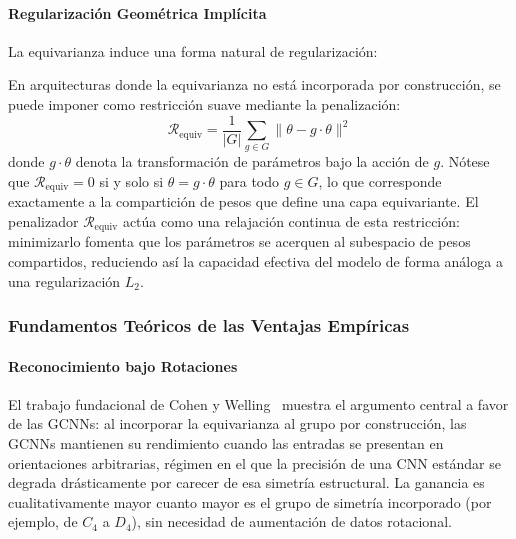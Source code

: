 \paragraph{Regularización Geométrica Implícita}

La equivarianza induce una forma natural de regularización:

\begin{remark}\label{prop:regularizacion_equivarianza}
En arquitecturas donde la equivarianza no está incorporada por construcción, se puede imponer como restricción suave mediante la penalización:
\begin{equation}
\mathcal{R}_{\text{equiv}} = \frac{1}{|G|} \sum_{g \in G} \|\theta - g \cdot \theta\|^2
\end{equation}
donde $g \cdot \theta$ denota la transformación de parámetros bajo la acción de $g$. Nótese que $\mathcal{R}_{\text{equiv}} = 0$ si y solo si $\theta = g \cdot \theta$ para todo $g \in G$, lo que corresponde exactamente a la compartición de pesos que define una capa equivariante. El penalizador $\mathcal{R}_{\text{equiv}}$ actúa como una relajación continua de esta restricción: minimizarlo fomenta que los parámetros se acerquen al subespacio de pesos compartidos, reduciendo así la capacidad efectiva del modelo de forma análoga a una regularización $L_2$.
\end{remark}

\subsubsection{Fundamentos Teóricos de las Ventajas Empíricas}

\paragraph{Reconocimiento bajo Rotaciones}

El trabajo fundacional de Cohen y Welling~\citep{cohen2016groupequivariantconvolutional} muestra el argumento central a favor de las \glspl{GCNN}: al incorporar la equivarianza al grupo por construcción, las \glspl{GCNN} mantienen su rendimiento cuando las entradas se presentan en orientaciones arbitrarias, régimen en el que la precisión de una CNN estándar se degrada drásticamente por carecer de esa simetría estructural. La ganancia es cualitativamente mayor cuanto mayor es el grupo de simetría incorporado (por ejemplo, de $C_4$ a $D_4$), sin necesidad de aumentación de datos rotacional.

